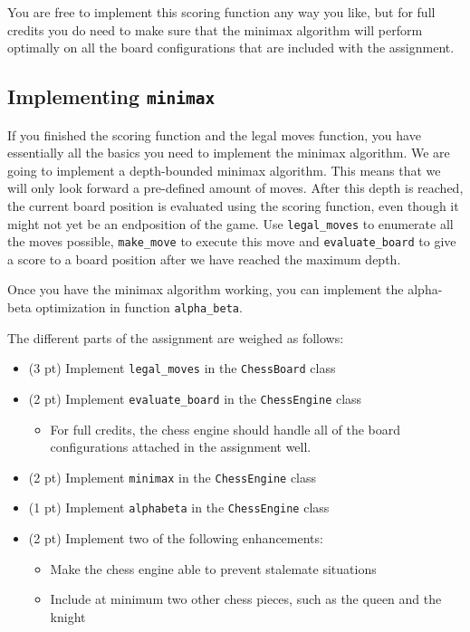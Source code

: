 \documentclass{article}
\begin{document}
You are free to implement this scoring function any way you like, but for full credits you do need to make sure that the minimax algorithm will perform optimally on all the board configurations that are included with the assignment.

\subsection{Implementing \texttt{minimax}}
If you finished the scoring function and the legal moves function, you have essentially all the basics you need to implement the minimax algorithm. We are going to implement a depth-bounded minimax algorithm. This means that we will only look forward a pre-defined amount of moves. After this depth is reached, the current board position is evaluated using the scoring function, even though it might not yet be an endposition of the game. Use \texttt{legal\_moves} to enumerate all the moves possible, \texttt{make\_move} to execute this move and \texttt{evaluate\_board} to give a score to a board position after we have reached the maximum depth.

Once you have the minimax algorithm working, you can implement the alpha-beta optimization in function \texttt{alpha\_beta}.

The different parts of the assignment are weighed as follows:
\begin{itemize}
    \item (3 pt) Implement \texttt{legal\_moves} in the \texttt{ChessBoard} class
    \item (2 pt) Implement \texttt{evaluate\_board} in the \texttt{ChessEngine} class
        \begin{itemize}
            \item For full credits, the chess engine should handle all of the board configurations attached in the assignment well.
        \end{itemize}
    \item (2 pt) Implement \texttt{minimax} in the \texttt{ChessEngine} class
    \item (1 pt) Implement \texttt{alphabeta} in the \texttt{ChessEngine} class
    \item (2 pt) Implement two of the following enhancements:
        \begin{itemize}           
            \item Make the chess engine able to prevent stalemate situations
            \item Include at minimum two other chess pieces, such as the queen and the knight
        \end{itemize}
\end{itemize}
\end{document}
